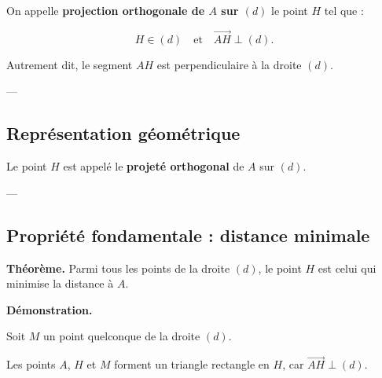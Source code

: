 \documentclass[11pt,a4paper]{article}
\begin{document}
On appelle \textbf{projection orthogonale de $A$ sur $(d)$} le point $H$ tel que :

\[
H \in (d) \quad \text{et} \quad \vec{AH} \perp (d).
\]

Autrement dit, le segment $AH$ est perpendiculaire à la droite $(d)$.

---

\subsection{Représentation géométrique}

\begin{center}
\end{center}

\bigskip

Le point $H$ est appelé le \textbf{projeté orthogonal} de $A$ sur $(d)$.

---

\subsection{Propriété fondamentale : distance minimale}

\textbf{Théorème.}  
Parmi tous les points de la droite $(d)$, le point $H$ est celui qui minimise la distance à $A$.

\bigskip

\textbf{Démonstration.}

Soit $M$ un point quelconque de la droite $(d)$.

\bigskip

Les points $A$, $H$ et $M$ forment un triangle rectangle en $H$, car $\vec{AH} \perp (d)$.

\bigskip
\end{document}
